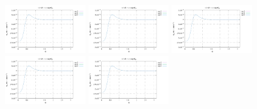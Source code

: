 \noindent
\includegraphics[width=3.5cm]{python_codes/fieldstone_152/RESULTS/exp3/err_16_m2}
\includegraphics[width=3.5cm]{python_codes/fieldstone_152/RESULTS/exp3/err_16_m3}
\includegraphics[width=3.5cm]{python_codes/fieldstone_152/RESULTS/exp3/err_16_m4}
\includegraphics[width=3.5cm]{python_codes/fieldstone_152/RESULTS/exp3/err_16_m5}
\includegraphics[width=3.5cm]{python_codes/fieldstone_152/RESULTS/exp3/err_16_m6}

